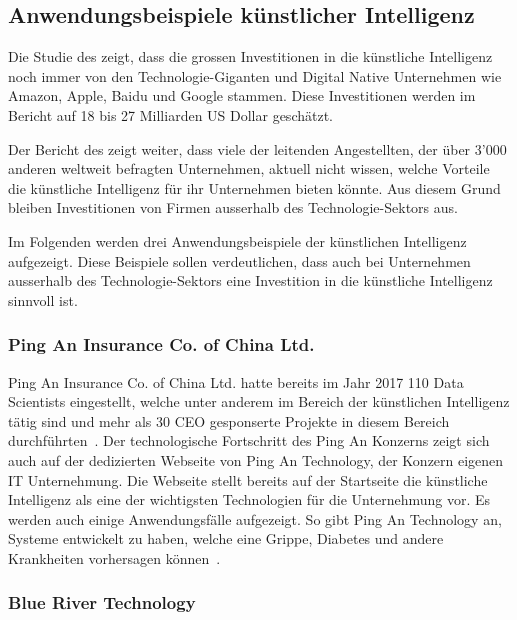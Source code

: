 \subsection{Anwendungsbeispiele künstlicher Intelligenz}


Die Studie des \textcite{Bughin} zeigt, dass die grossen Investitionen in die künstliche Intelligenz noch immer von den Technologie-Giganten und Digital Native Unternehmen wie Amazon, Apple, Baidu und Google stammen. Diese Investitionen werden im Bericht auf 18 bis 27 Milliarden US Dollar geschätzt. 

Der Bericht des \textcite{Bughin} zeigt weiter, dass viele der leitenden Angestellten, der über 3'000 anderen weltweit befragten Unternehmen, aktuell nicht wissen, welche Vorteile die künstliche Intelligenz für ihr Unternehmen bieten könnte. Aus diesem Grund bleiben Investitionen von Firmen ausserhalb des Technologie-Sektors aus.

Im Folgenden werden drei Anwendungsbeispiele der künstlichen Intelligenz aufgezeigt. Diese Beispiele sollen verdeutlichen, dass auch bei Unternehmen ausserhalb des Technologie-Sektors eine Investition in die künstliche Intelligenz sinnvoll ist.

\subsubsection{Ping An Insurance Co. of China Ltd.}

Ping An Insurance Co. of China Ltd. hatte bereits im Jahr 2017 110 Data Scientists eingestellt, welche unter anderem im Bereich der künstlichen Intelligenz tätig sind und mehr als 30 CEO gesponserte Projekte in diesem Bereich durchführten~\autocite{Ransbotham2017}. Der technologische Fortschritt des Ping An Konzerns zeigt sich auch auf der dedizierten Webseite von Ping An Technology, der Konzern eigenen IT Unternehmung. Die Webseite stellt bereits auf der Startseite die künstliche Intelligenz als eine der wichtigsten Technologien für die Unternehmung vor. Es werden auch einige Anwendungsfälle aufgezeigt. So gibt Ping An Technology an, Systeme entwickelt zu haben, welche eine Grippe, Diabetes und andere Krankheiten vorhersagen können~\autocite{PingAnTechnology}.

\subsubsection{Blue River Technology}

